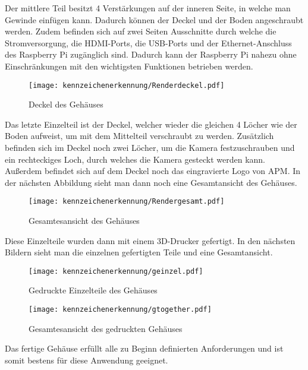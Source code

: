 Der mittlere Teil besitzt 4 Verstärkungen auf der inneren Seite, in welche man Gewinde einfügen kann. Dadurch können der Deckel und der Boden angeschraubt werden. 
Zudem befinden sich auf zwei Seiten Ausschnitte durch welche die Stromversorgung, die HDMI-Ports, die USB-Ports und der Ethernet-Anschluss des Raspberry Pi 
zugänglich sind. Dadurch kann der Raspberry Pi nahezu ohne Einschränkungen mit den wichtigsten Funktionen betrieben werden.

\begin{figure}[H]
    \centering
    \texttt{[image: kennzeichenerkennung/Renderdeckel.pdf]}
    \caption{Deckel des Gehäuses}
\end{figure}

Das letzte Einzelteil ist der Deckel, welcher wieder die gleichen 4 Löcher wie der Boden aufweist, um mit dem Mittelteil verschraubt zu werden. 
Zusätzlich befinden sich im Deckel noch zwei Löcher, um die Kamera festzuschrauben und ein rechteckiges Loch, durch welches die Kamera gesteckt werden kann. 
Außerdem befindet sich auf dem Deckel noch das eingravierte Logo von APM. In der nächsten Abbildung sieht man dann noch eine Gesamtansicht des Gehäuses.

\begin{figure}[H]
    \centering
    \texttt{[image: kennzeichenerkennung/Rendergesamt.pdf]}
    \caption{Gesamtesansicht des Gehäuses}
\end{figure}

Diese Einzelteile wurden dann mit einem 3D-Drucker gefertigt. In den nächsten Bildern sieht man die einzelnen gefertigten Teile und eine Gesamtansicht.

\begin{figure}[H]
    \centering
    \texttt{[image: kennzeichenerkennung/geinzel.pdf]}
    \caption{Gedruckte Einzelteile des Gehäuses}
\end{figure}

\begin{figure}[H]
    \centering
    \texttt{[image: kennzeichenerkennung/gtogether.pdf]}
    \caption{Gesamtesansicht des gedruckten Gehäuses}
\end{figure}

Das fertige Gehäuse erfüllt alle zu Beginn definierten Anforderungen und ist somit bestens für diese Anwendung geeignet.